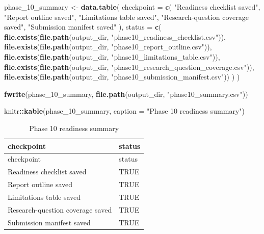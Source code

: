 \documentclass[
]{article}
\newenvironment{Shaded}{\begin{snugshade}}{\end{snugshade}}
\newcommand{\AttributeTok}[1]{\textcolor[rgb]{0.13,0.29,0.53}{#1}}
\newcommand{\FunctionTok}[1]{\textcolor[rgb]{0.13,0.29,0.53}{\textbf{#1}}}
\newcommand{\NormalTok}[1]{#1}
\newcommand{\OtherTok}[1]{\textcolor[rgb]{0.56,0.35,0.01}{#1}}
\newcommand{\SpecialCharTok}[1]{\textcolor[rgb]{0.81,0.36,0.00}{\textbf{#1}}}
\newcommand{\StringTok}[1]{\textcolor[rgb]{0.31,0.60,0.02}{#1}}
\begin{document}
\begin{Shaded}
\begin{Highlighting}[]
\NormalTok{phase\_10\_summary }\OtherTok{\textless{}{-}} \FunctionTok{data.table}\NormalTok{(}
  \AttributeTok{checkpoint =} \FunctionTok{c}\NormalTok{(}
    \StringTok{"Readiness checklist saved"}\NormalTok{,}
    \StringTok{"Report outline saved"}\NormalTok{,}
    \StringTok{"Limitations table saved"}\NormalTok{,}
    \StringTok{"Research{-}question coverage saved"}\NormalTok{,}
    \StringTok{"Submission manifest saved"}
\NormalTok{  ),}
  \AttributeTok{status =} \FunctionTok{c}\NormalTok{(}
    \FunctionTok{file.exists}\NormalTok{(}\FunctionTok{file.path}\NormalTok{(output\_dir, }\StringTok{"phase10\_readiness\_checklist.csv"}\NormalTok{)),}
    \FunctionTok{file.exists}\NormalTok{(}\FunctionTok{file.path}\NormalTok{(output\_dir, }\StringTok{"phase10\_report\_outline.csv"}\NormalTok{)),}
    \FunctionTok{file.exists}\NormalTok{(}\FunctionTok{file.path}\NormalTok{(output\_dir, }\StringTok{"phase10\_limitations\_table.csv"}\NormalTok{)),}
    \FunctionTok{file.exists}\NormalTok{(}\FunctionTok{file.path}\NormalTok{(output\_dir, }\StringTok{"phase10\_research\_question\_coverage.csv"}\NormalTok{)),}
    \FunctionTok{file.exists}\NormalTok{(}\FunctionTok{file.path}\NormalTok{(output\_dir, }\StringTok{"phase10\_submission\_manifest.csv"}\NormalTok{))}
\NormalTok{  )}
\NormalTok{)}

\FunctionTok{fwrite}\NormalTok{(phase\_10\_summary, }\FunctionTok{file.path}\NormalTok{(output\_dir, }\StringTok{"phase10\_summary.csv"}\NormalTok{))}

\NormalTok{knitr}\SpecialCharTok{::}\FunctionTok{kable}\NormalTok{(phase\_10\_summary, }\AttributeTok{caption =} \StringTok{"Phase 10 readiness summary"}\NormalTok{)}
\end{Highlighting}
\end{Shaded}

\begin{longtable}[]{@{}ll@{}}
\caption{Phase 10 readiness summary}\tabularnewline
\toprule\noalign{}
checkpoint & status \\
\midrule\noalign{}
\endfirsthead
\toprule\noalign{}
checkpoint & status \\
\midrule\noalign{}
\endhead
\bottomrule\noalign{}
\endlastfoot
Readiness checklist saved & TRUE \\
Report outline saved & TRUE \\
Limitations table saved & TRUE \\
Research-question coverage saved & TRUE \\
Submission manifest saved & TRUE \\
\end{longtable}
\end{document}
